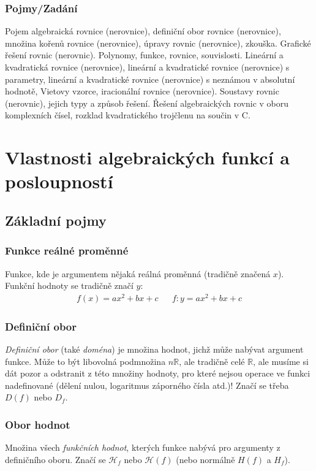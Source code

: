 \documentclass[12pt]{article}
\newcommand{\nR}{\mathbb{R}} %
\begin{document}
\subsubsection{Pojmy/Zadání}
Pojem algebraická rovnice (nerovnice), definiční obor rovnice (nerovnice), množina kořenů rovnice (nerovnice), úpravy rovnic (nerovnice), zkouška. Grafické řešení rovnic (nerovnic). Polynomy, funkce, rovnice, souvislosti. Lineární a kvadratická rovnice (nerovnice), lineární a kvadratické rovnice (nerovnice) s parametry, lineární a kvadratické rovnice (nerovnice) s neznámou v absolutní hodnotě, Vietovy vzorce, iracionální rovnice (nerovnice). Soustavy rovnic (nerovnic), jejich typy a způsob řešení. Řešení algebraických rovnic v oboru komplexních čísel, rozklad kvadratického trojčlenu na součin v C.

\section{Vlastnosti algebraických funkcí a posloupností}
\subsection{Základní pojmy}
\subsubsection{Funkce reálné proměnné}
Funkce, kde je argumentem nějaká reálná proměnná (tradičně značená $x$). Funkční hodnoty se tradičně značí $y$:
\begin{align}
f(x) = ax^2 +bx +c && f: y=ax^2 +bx +c 
\end{align}
\subsubsection{Definiční obor}
\emph{Definiční obor} (také \emph{doména}) je množina hodnot, jichž může nabývat argument funkce. Může to být libovolná podmnožina $n\nR$, ale tradičně celé $\nR$, ale musíme si dát pozor a odstranit z této množiny hodnoty, pro které nejsou operace ve funkci nadefinované (dělení nulou, logaritmus záporného čísla atd.)! Značí se třeba$D(f)$ nebo $D_f$.
\subsubsection{Obor hodnot}
Množina všech \emph{funkčních hodnot}, kterých funkce nabývá pro argumenty z definičního oboru. Značí se $ \mathcal {H}_{f}$ nebo $\mathcal {H}(f)$ (nebo normálně $H(f)$ a $H_f$).
\end{document}
